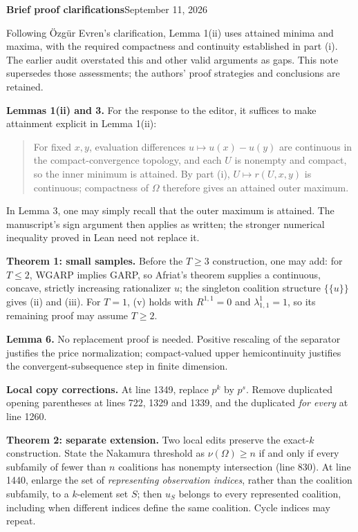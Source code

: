 \documentclass[11pt]{article}
\begin{document}
{\Large\bfseries Brief proof clarifications}\hfill September 11, 2026

Following \"Ozg\"ur Evren's clarification, Lemma 1(ii) uses attained minima and maxima, with the required compactness and continuity established in part (i). The earlier audit overstated this and other valid arguments as gaps. This note supersedes those assessments; the authors' proof strategies and conclusions are retained.

\textbf{Lemmas 1(ii) and 3.}
For the response to the editor, it suffices to make attainment explicit in Lemma 1(ii):
\begin{quote}\small
For fixed $x,y$, evaluation differences $u\mapsto u(x)-u(y)$ are continuous in the compact-convergence topology, and each $U$ is nonempty and compact, so the inner minimum is attained. By part (i), $U\mapsto r(U,x,y)$ is continuous; compactness of $\Omega$ therefore gives an attained outer maximum.
\end{quote}
In Lemma 3, one may simply recall that the outer maximum is attained. The manuscript's sign argument then applies as written; the stronger numerical inequality proved in Lean need not replace it.

\textbf{Theorem 1: small samples.}
Before the $T\geq3$ construction, one may add: for $T\leq2$, WGARP implies GARP, so Afriat's theorem supplies a continuous, concave, strictly increasing rationalizer $u$; the singleton coalition structure $\{\{u\}\}$ gives (ii) and (iii). For $T=1$, (v) holds with $R^{1,1}=0$ and $\lambda^1_{1,1}=1$, so its remaining proof may assume $T\geq2$.

\textbf{Lemma 6.}
No replacement proof is needed. Positive rescaling of the separator justifies the price normalization; compact-valued upper hemicontinuity justifies the convergent-subsequence step in finite dimension.

\textbf{Local copy corrections.}
At line 1349, replace $p^k$ by $p^s$. Remove duplicated opening parentheses at lines 722, 1329 and 1339, and the duplicated \emph{for every} at line 1260.

\textbf{Theorem 2: separate extension.}
Two local edits preserve the exact-$k$ construction. State the Nakamura threshold as
$\nu(\Omega)\geq n$ if and only if every subfamily of fewer than $n$ coalitions has nonempty intersection (line 830). At line 1440, enlarge the set of \emph{representing observation indices}, rather than the coalition subfamily, to a $k$-element set $S$; then $u_S$ belongs to every represented coalition, including when different indices define the same coalition. Cycle indices may repeat.
\end{document}
